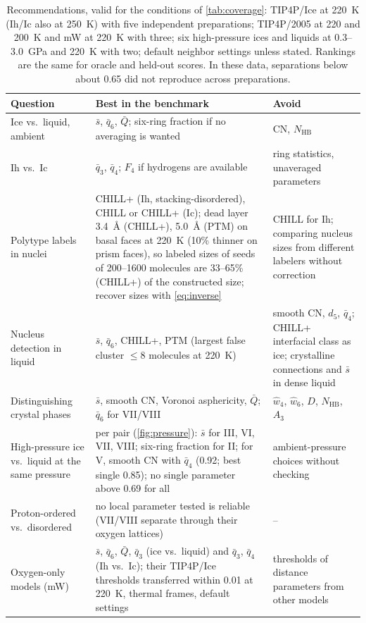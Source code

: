\documentclass[11pt,a4paper]{article}
\begin{document}
\begin{table}[H]
\centering
\small
\caption{Recommendations, valid for the conditions of \cref{tab:coverage}:
TIP4P/Ice at 220~K (Ih/Ic also at 250~K) with five independent preparations;
TIP4P/2005 at 220 and 200~K and mW at 220~K with three; six high-pressure
ices and liquids at 0.3--3.0~GPa and 220~K with two; default neighbor
settings unless stated. Rankings are the same for oracle and held-out scores.
In these data, separations below about 0.65 did not reproduce across
preparations.}
\label{tab:guide}
\begin{tabular}{>{\raggedright\arraybackslash}p{.24\linewidth}>{\raggedright\arraybackslash}p{.38\linewidth}>{\raggedright\arraybackslash}p{.28\linewidth}}
\toprule
Question & Best in the benchmark & Avoid \\
\midrule
Ice vs.\ liquid, ambient & $\bar s$, $\bar q_6$, $\bar Q$; six-ring fraction if no
averaging is wanted & CN, $N_\mathrm{HB}$ \\
Ih vs.\ Ic & $\bar q_3$, $\bar q_4$; $F_4$ if hydrogens are available & ring
statistics, unaveraged parameters \\
Polytype labels in nuclei & CHILL+ (Ih, stacking-disordered), CHILL or
CHILL+ (Ic); dead layer 3.4~\AA{} (CHILL+), 5.0~\AA{} (PTM) on basal faces
at 220~K (10\% thinner on prism faces), so labeled sizes of seeds of
200--1600 molecules are 33--65\% (CHILL+) of the constructed size; recover
sizes with \cref{eq:inverse} & CHILL for Ih; comparing nucleus
sizes from different labelers without correction \\
Nucleus detection in liquid & $\bar s$, $\bar q_6$, CHILL+, PTM (largest false
cluster $\le$8 molecules at 220~K) & smooth CN, $d_5$, $\bar q_4$; CHILL+
interfacial class as ice; crystalline connections and $\bar s$ in dense liquid \\
Distinguishing crystal phases & $\bar s$, smooth CN, Voronoi asphericity,
$\bar Q$; $\bar q_6$ for VII/VIII & $\hat w_4$, $\hat w_6$, $D$, $N_\mathrm{HB}$,
$A_3$ \\
High-pressure ice vs.\ liquid at the same pressure & per pair
(\cref{fig:pressure}): $\bar s$ for III, VI, VII, VIII; six-ring fraction for
II; for V, smooth CN with $\bar q_4$ (0.92; best single 0.85); no single parameter above 0.69 for all &
ambient-pressure choices without checking \\
Proton-ordered vs.\ disordered & no local parameter tested is reliable
(VII/VIII separate through their oxygen lattices) & -- \\
Oxygen-only models (mW) & $\bar s$, $\bar q_6$, $\bar Q$, $\bar q_3$ (ice vs.\
liquid) and $\bar q_3$, $\bar q_4$ (Ih vs.\ Ic); their TIP4P/Ice thresholds
transferred within 0.01 at 220~K, thermal frames, default settings & thresholds
of distance parameters from other models \\
\bottomrule
\end{tabular}
\end{table}
\end{document}
